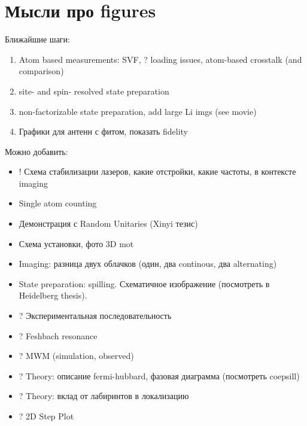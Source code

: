 \section*{Мысли про figures}


Ближайшие шаги:
\begin{enumerate}
	
	\item Atom based measurements: SVF, ? loading issues, atom-based crosstalk (and comparison)
	
	\item site- and spin- resolved state preparation

	\item non-factorizable state preparation, add large Li imgs (see movie)

	\item Графики для антенн с фитом, показать fidelity

\end{enumerate}

Можно добавить:
\begin{itemize}
	\item ! Схема стабилизации лазеров, какие отстройки, какие частоты, в контексте imaging
	\item Single atom counting
	\item Демонстрация с Random Unitaries (Xinyi тезис)
	\item Схема установки, фото 3D mot
	\item Imaging: разница двух облачков (один, два continous, два alternating)
	\item State preparation: spilling. Схематичное изображение (посмотреть в Heidelberg thesis).
	\item ? Экспериментальная последовательность
	\item ? Feshbach resonance
	\item ? MWM (simulation, observed)
	\item ? Theory: описание fermi-hubbard, фазовая диаграмма (посмотреть coepsill)
	\item ? Theory: вклад от лабиринтов в локализацию
	\item ? 2D Step Plot
\end{itemize}